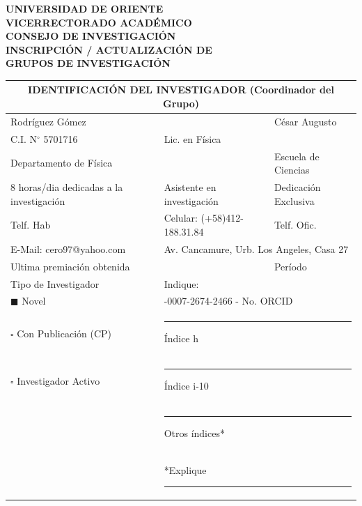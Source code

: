 \documentclass[12pt, a4paper]{article}
\begin{document}
\begin{center}
    \textbf{UNIVERSIDAD DE ORIENTE}\\
    \textbf{VICERRECTORADO ACADÉMICO}\\
    \textbf{CONSEJO DE INVESTIGACIÓN}\\
    \vspace{0.5cm}
    {\Large \textbf{INSCRIPCIÓN / ACTUALIZACIÓN DE}}\\
    {\Large \textbf{GRUPOS DE INVESTIGACIÓN}}
\end{center}

\vspace{0.5cm}

\noindent
\renewcommand{\arraystretch}{1.5}
\begin{tabularx}{\textwidth}{|X|X|X|}
\hline
\multicolumn{3}{|c|}{\cellcolor[gray]{0.9}\textbf{IDENTIFICACIÓN DEL INVESTIGADOR (Coordinador del Grupo)}} \\
\hline
\multicolumn{2}{|l|}{Rodríguez Gómez} & César Augusto \\
\hline
C.I. N$^\circ$ 5701716& \multicolumn{2}{l|}{Lic. en Física} \\
\hline
\multicolumn{2}{|l|}{Departamento de Física} & Escuela de Ciencias \\
\hline
8 horas/dia dedicadas a la investigación & Asistente en investigación & Dedicación Exclusiva \\
\hline
Telf. Hab & Celular: (+58)412-188.31.84 & Telf. Ofic. \\
\hline
E-Mail: cero97@yahoo.com & \multicolumn{2}{l|}{Av. Cancamure, Urb. Los Angeles, Casa 27} \\
\hline
\multicolumn{2}{|l|}{Ultima premiación obtenida} & Período \\
\hline
\multicolumn{1}{|l|}{Tipo de Investigador} & \multicolumn{2}{l|}{Indique:} \\
\multicolumn{1}{|l|}{\quad $\blacksquare$ Novel} & \multicolumn{2}{l|}{\quad 0009-0007-2674-2466 - No. ORCID} \\
\multicolumn{1}{|l|}{\quad $\square$ Con Publicación (CP)} & \multicolumn{2}{l|}{\quad \rule{4cm}{0.4pt} Índice h} \\
\multicolumn{1}{|l|}{\quad $\square$ Investigador Activo} & \multicolumn{2}{l|}{\quad \rule{4cm}{0.4pt} Índice i-10} \\
\multicolumn{1}{|l|}{} & \multicolumn{2}{l|}{\quad \rule{4cm}{0.4pt} Otros índices*} \\
\multicolumn{1}{|l|}{} & \multicolumn{2}{l|}{*Explique \rule{6cm}{0.4pt}} \\
\hline
\end{tabularx}
\end{document}
